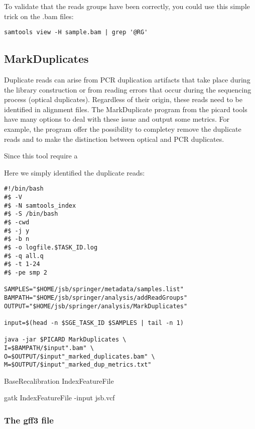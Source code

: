 To validate that the reads groups have been correctly, you could use this simple trick on the .bam files:

\begin{verbatim}
samtools view -H sample.bam | grep '@RG' 
\end{verbatim}






\subsection{MarkDuplicates}








Duplicate reads can arise from PCR duplication artifacts that take place during the library construction or from reading errors that occur during the sequencing process (optical duplicates). Regardless of their origin, these reads need to be identified in alignment files. The MarkDuplicate program from the picard tools have many options to deal with these issue and output some metrics. For example, the program offer the possibility to completey remove the duplicate reads and to make the distinction between optical and PCR duplicates.

Since this tool require a



Here we simply identified the duplicate reads:

\begin{verbatim}
#!/bin/bash
#$ -V
#$ -N samtools_index
#$ -S /bin/bash
#$ -cwd
#$ -j y
#$ -b n
#$ -o logfile.$TASK_ID.log
#$ -q all.q
#$ -t 1-24
#$ -pe smp 2

SAMPLES="$HOME/jsb/springer/metadata/samples.list"
BAMPATH="$HOME/jsb/springer/analysis/addReadGroups"
OUTPUT="$HOME/jsb/springer/analysis/MarkDuplicates"

input=$(head -n $SGE_TASK_ID $SAMPLES | tail -n 1)

java -jar $PICARD MarkDuplicates \
I=$BAMPATH/$input".bam" \
O=$OUTPUT/$input"_marked_duplicates.bam" \
M=$OUTPUT/$input"_marked_dup_metrics.txt"
\end{verbatim}





BaseRecalibration
IndexFeatureFile

gatk IndexFeatureFile -input jsb.vcf


\subsubsection{The gff3 file}

